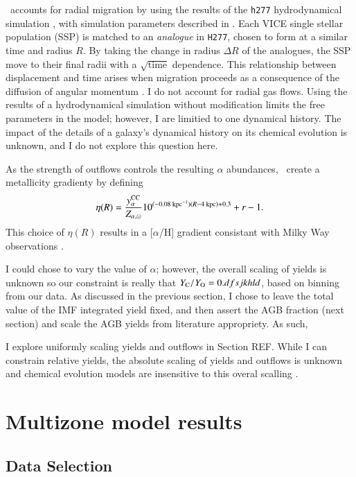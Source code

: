 \documentclass[12pt,oneside]{report}
\newcommand{\JJ}{\citetalias{james+21}}
\begin{document}
\JJ\ accounts for radial migration by using the results of the \texttt{h277} hydrodynamical simulation \citep{christensen12, zolotov12, loebman12, BZ14}, with simulation parameters described in \citet{bird+21}. Each VICE single stellar population (SSP) is matched to an \textit{analogue} in \texttt{H277}, chosen to form at a similar time and radius $R$. By taking the change in radius $\Delta R$ of the analogues, the SSP move to their final radii with a $\sqrt{\text{time}}$ dependence.
This relationship between displacement and time arises when migration proceeds as a consequence of the diffusion of angular momentum \citep{frankel18, frankel20}.
I do not account for radial gas flows.
Using the results of a hydrodynamical simulation without modification limits the free parameters in the model; however, I are limitied to one dynamical history. The impact of the details of a galaxy's dynamical history on its chemical evolution is unknown, and I do not explore this question here.

As the strength of outflows controls the resulting $\alpha$ abundances, \JJ~create a metallicity gradienty by defining
\begin{equation}
\eta(R) = \frac{y_{\alpha}^{\rm CC}}{Z_{\alpha, \odot}} 10^{(-0.08\text{ kpc}^{-1})(R-4\text{ kpc})+0.3} + r - 1.
\end{equation}
This choice of $\eta(R)$ results in a [$\alpha$/H] gradient consistant with Milky Way observations \citep{james+21}.

I could chose to vary the value of $\alpha$; however, the overall scaling of
yields is unknown so our constraint is really that $Y_{\rm C}/Y_{\rm O} =
0.dfsjkhld$, based on binning from our data. As discussed in the previous
section, I chose to leave the total value of the IMF integrated yield fixed,
and then assert the AGB fraction (next section) and scale the AGB yields from
literature appropriety. As such, 

I explore uniformly scaling yields and outflows in Section REF. While I can constrain relative yields, the absolute scaling of yields and outflows is unknown and chemical evolution models are insensitive to this overal scalling \citep[e.g.][]{james_dwarf}.


\chapter{Multizone model results}
\section{Data Selection}
\end{document}
